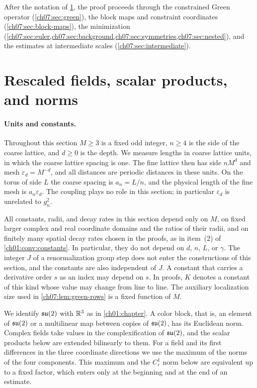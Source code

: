 After the notation of \cref{ch07:sec:conventions}, the proof proceeds through the constrained Green operator (\cref{ch07:sec:green}), the block maps and constraint coordinates (\cref{ch07:sec:block-maps}), the minimization (\cref{ch07:sec:euler,ch07:sec:background,ch07:sec:symmetries,ch07:sec:nested}), and the estimates at intermediate scales (\cref{ch07:sec:intermediate}).

\section{Rescaled fields, scalar products, and norms}\label{ch07:sec:conventions}

\paragraph{Units and constants.}
Throughout this section $M\ge3$ is a fixed odd integer, $n\ge4$ is the side of the coarse lattice, and $d\ge0$ is the depth. We measure lengths in coarse lattice units, in which the coarse lattice spacing is one. The fine lattice then has side $nM^d$ and mesh $\varepsilon_d=M^{-d}$, and all distances are periodic distances in these units. On the torus of side $L$ the coarse spacing is $a_n=L/n$, and the physical length of the fine mesh is $a_n\varepsilon_d$. The coupling plays no role in this section; in particular $\varepsilon_d$ is unrelated to $g_n^2$.

All constants, radii, and decay rates in this section depend only on $M$, on fixed larger complex and real coordinate domains and the ratios of their radii, and on finitely many spatial decay rates chosen in the proofs, as in item~(2) of \cref{ch01:conv:constants}. In particular, they do not depend on $d$, $n$, $L$, or $\gamma$. The integer $J$ of a renormalization group step does not enter the constructions of this section, and the constants are also independent of $J$. A constant that carries a derivative order $s$ as an index may depend on $s$. In proofs, $K$ denotes a constant of this kind whose value may change from line to line. The auxiliary localization size used in \cref{ch07:lem:green-rows} is a fixed function of $M$.

We identify $\mathfrak{su}(2)$ with $\mathbb R^3$ as in \cref{ch01:chapter}. A color block, that is, an element of $\mathfrak{su}(2)$ or a multilinear map between copies of $\mathfrak{su}(2)$, has its Euclidean norm. Complex fields take values in the complexification of $\mathfrak{su}(2)$, and the scalar products below are extended bilinearly to them. For a field and its first differences in the three coordinate directions we use the maximum of the norms of the four components. This maximum and the $C^1_\varepsilon$ norm below are equivalent up to a fixed factor, which enters only at the beginning and at the end of an estimate.


